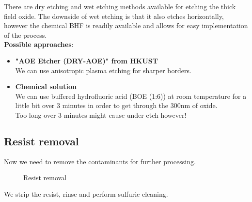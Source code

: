 There are dry etching and wet etching methods available for etching the thick field oxide.
The downside of wet etching is that it also etches horizontally, however the chemical BHF is readily available and allows for easy implementation of the process.\\

\textbf{Possible approaches}:
\begin{itemize}
	\item \textbf{"AOE Etcher (DRY-AOE)" from HKUST} \\
	We can use anisotropic plasma etching for sharper borders.
	\item \textbf{Chemical solution} \\
	We can use buffered hydrofluoric acid (BOE (1:6)) at room temperature for a little bit over 3 minutes in order to get through the 300nm of oxide.\\
	Too long over 3 minutes might cause under-etch however!
\end{itemize}

\subsection{Resist removal}
Now we need to remove the contaminants for further processing.

\begin{figure}[H]
	\centering
	\begin{tikzpicture}[node distance = 3cm, auto, thick,scale=\CrossSectionOnly, every node/.style={transform shape}]
		
	\end{tikzpicture}
	\drawStepArrow{}
	\begin{tikzpicture}[node distance = 3cm, auto, thick,scale=\CrossSectionOnly, every node/.style={transform shape}]
		
	\end{tikzpicture}
	\caption{Resist removal}
\end{figure}

We strip the resist, rinse and perform sulfuric cleaning.